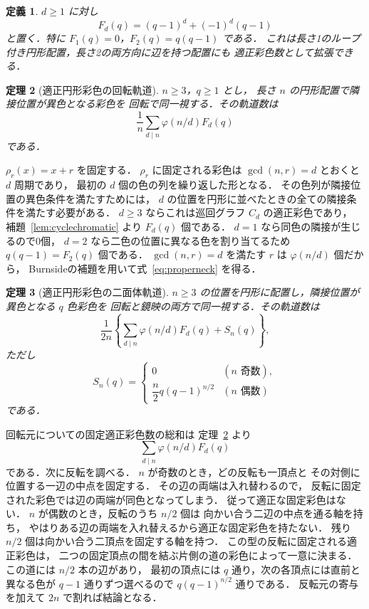 \documentclass[a5paper,10pt,onecolumn]{jsarticle}
\makeatletter
\theoremstyle{mathnotetheorem}
\newtheorem{theorem}{定理}[section]
\newtheorem{definition}[theorem]{定義}
\renewcommand{\proofname}{証明}
\renewenvironment{proof}[1][\proofname]{%
  \par\pushQED{\qed}\normalfont\topsep4\p@\@plus2\p@\relax
  \trivlist\item[\hskip\labelsep\bfseries #1]\ignorespaces
}{\popQED\endtrivlist\@endpefalse}
\makeatother
\begin{document}
\begin{definition}
$d\ge1$ に対し
\[
 F_d(q)=(q-1)^d+(-1)^d(q-1)
\]
と置く．特に $F_1(q)=0$，$F_2(q)=q(q-1)$ である．
これは長さ1のループ付き円形配置，長さ2の両方向に辺を持つ配置にも
適正彩色数として拡張できる．
\end{definition}

\begin{theorem}[適正円形彩色の回転軌道]\label{thm:propernecklace}
$n\ge3$，$q\ge1$ とし，
長さ $n$ の円形配置で隣接位置が異色となる彩色を
回転で同一視する．その軌道数は
\begin{equation}\label{eq:properneck}
 \frac1n\sum_{d\mid n}\varphi(n/d)F_d(q)
\end{equation}
である．
\end{theorem}
\begin{proof}
$\rho_r(x)=x+r$ を固定する．
$\rho_r$ に固定される彩色は
$\gcd(n,r)=d$ とおくと $d$ 周期であり，
最初の $d$ 個の色の列を繰り返した形となる．
その色列が隣接位置の異色条件を満たすためには，
$d$ の位置を円形に並べたときの全ての隣接条件を満たす必要がある．
$d\ge3$ ならこれは巡回グラフ $C_d$ の適正彩色であり，
補題~\ref{lem:cyclechromatic} より $F_d(q)$ 個である．
$d=1$ なら同色の隣接が生じるので0個，
$d=2$ なら二色の位置に異なる色を割り当てるため
$q(q-1)=F_2(q)$ 個である．
$\gcd(n,r)=d$ を満たす $r$ は $\varphi(n/d)$ 個だから，
Burnsideの補題を用いて式~\eqref{eq:properneck} を得る．
\end{proof}

\begin{theorem}[適正円形彩色の二面体軌道]\label{thm:properbracelet}
$n\ge3$ の位置を円形に配置し，隣接位置が異色となる $q$ 色彩色を
回転と鏡映の両方で同一視する．その軌道数は
\[
 \frac1{2n}\left\{
 \sum_{d\mid n}\varphi(n/d)F_d(q)+S_n(q)\right\},
\]
ただし
\[
 S_n(q)=\begin{cases}
 0&(n\text{ 奇数}),\\
 \dfrac n2q(q-1)^{n/2}&(n\text{ 偶数})
 \end{cases}
\]
である．
\end{theorem}
\begin{proof}
回転元についての固定適正彩色数の総和は
定理~\ref{thm:propernecklace} より
\[
 \sum_{d\mid n}\varphi(n/d)F_d(q)
\]
である．次に反転を調べる．
$n$ が奇数のとき，どの反転も一頂点と
その対側に位置する一辺の中点を固定する．
その辺の両端は入れ替わるので，
反転に固定された彩色では辺の両端が同色となってしまう．
従って適正な固定彩色はない．
$n$ が偶数のとき，反転のうち $n/2$ 個は
向かい合う二辺の中点を通る軸を持ち，
やはりある辺の両端を入れ替えるから適正な固定彩色を持たない．
残り $n/2$ 個は向かい合う二頂点を固定する軸を持つ．
この型の反転に固定される適正彩色は，
二つの固定頂点の間を結ぶ片側の道の彩色によって一意に決まる．
この道には $n/2$ 本の辺があり，
最初の頂点には $q$ 通り，次の各頂点には直前と異なる色が
$q-1$ 通りずつ選べるので $q(q-1)^{n/2}$ 通りである．
反転元の寄与を加えて $2n$ で割れば結論となる．
\end{proof}
\end{document}
